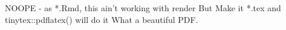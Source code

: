 \documentclass{article}
\begin{document}
NOOPE - as *.Rmd, this ain't working with render
But Make it *.tex and tinytex::pdflatex() will do it
What a beautiful PDF.
\end{document}
